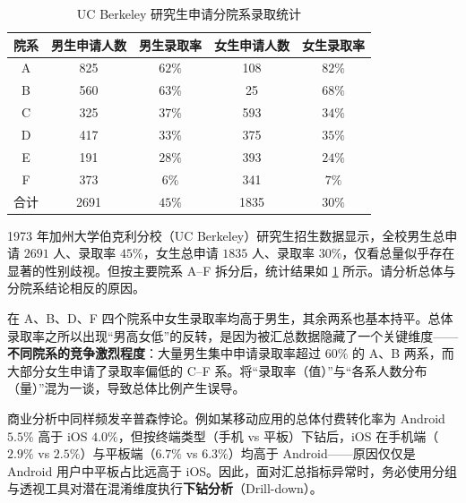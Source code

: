 \begin{table}[htbp]
  \centering\small
  \caption{UC Berkeley 研究生申请分院系录取统计}\label{tab:berkeley-simpson}
  \begin{tabular}{@{}ccccc@{}}
    \toprule
    院系 & 男生申请人数 & 男生录取率 & 女生申请人数 & 女生录取率 \\
    \midrule
    A & 825 & $62\%$ & 108 & $82\%$ \\
    B & 560 & $63\%$ & 25  & $68\%$ \\
    C & 325 & $37\%$ & 593 & $34\%$ \\
    D & 417 & $33\%$ & 375 & $35\%$ \\
    E & 191 & $28\%$ & 393 & $24\%$ \\
    F & 373 & $6\%$  & 341 & $7\%$  \\
    \midrule
    合计 & 2691 & $45\%$ & 1835 & $30\%$ \\
    \bottomrule
  \end{tabular}
\end{table}

\begin{example}[title={UC Berkeley 研究生录取中的辛普森悖论}]\label{eg:berkeley-simpson}
1973 年加州大学伯克利分校（UC Berkeley）研究生招生数据显示，全校男生总申请 $2691$ 人、录取率 $45\%$，女生总申请 $1835$ 人、录取率 $30\%$，仅看总量似乎存在显著的性别歧视。但按主要院系 A–F 拆分后，统计结果如 \cref{tab:berkeley-simpson} 所示。请分析总体与分院系结论相反的原因。

\begin{solution}
在 A、B、D、F 四个院系中女生录取率均高于男生，其余两系也基本持平。总体录取率之所以出现“男高女低”的反转，是因为被汇总数据隐藏了一个关键维度——\textbf{不同院系的竞争激烈程度}：大量男生集中申请录取率超过 $60\%$ 的 A、B 两系，而大部分女生申请了录取率偏低的 C–F 系。将“录取率（值）”与“各系人数分布（量）”混为一谈，导致总体比例产生误导。
\end{solution}
\end{example}

\begin{pitfall}[仅凭汇总指标下结论]\label{pit:drill-down}
商业分析中同样频发辛普森悖论。例如某移动应用的总体付费转化率为 Android $5.5\%$ 高于 iOS $4.0\%$，但按终端类型（手机 vs 平板）下钻后，iOS 在手机端（$2.9\%$ vs $2.5\%$）与平板端（$6.7\%$ vs $6.3\%$）均高于 Android——原因仅仅是 Android 用户中平板占比远高于 iOS。因此，面对汇总指标异常时，务必使用分组与透视工具对潜在混淆维度执行\textbf{下钻分析}（Drill-down）。
\end{pitfall}

